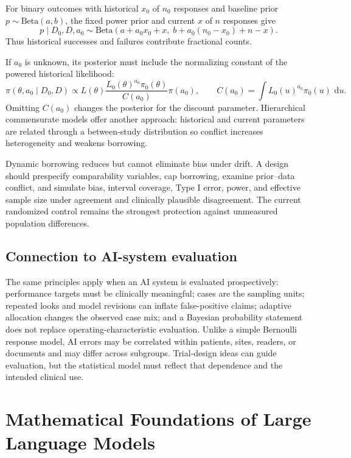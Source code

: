 \documentclass[12pt,oneside]{book}
\numberwithin{equation}{section}
\theoremstyle{definition}
\theoremstyle{plain}
\theoremstyle{remark}
\newcommand{\dd}{\,\mathrm{d}}
\newcommand{\BetaDist}{\mathrm{Beta}}
\begin{document}
For binary outcomes with historical $x_0$ of $n_0$ responses and baseline prior
$p\sim\BetaDist(a,b)$, the fixed power prior and current $x$ of $n$ responses
give
\[
 p\mid D_0,D,a_0
 \sim\BetaDist\!\left(
   a+a_0x_0+x,\;
   b+a_0(n_0-x_0)+n-x
 \right).
\]
Thus historical successes and failures contribute fractional counts.

If $a_0$ is unknown, its posterior must include the normalizing constant of the
powered historical likelihood:
\[
 \pi(\theta,a_0\mid D_0,D)
 \propto
 L(\theta)
 \frac{L_0(\theta)^{a_0}\pi_0(\theta)}{C(a_0)}
 \pi(a_0),
 \qquad
 C(a_0)=\int L_0(u)^{a_0}\pi_0(u)\,\dd u.
\]
Omitting $C(a_0)$ changes the posterior for the discount parameter.  Hierarchical
commensurate models offer another approach: historical and current parameters
are related through a between-study distribution so conflict increases
heterogeneity and weakens borrowing.

Dynamic borrowing reduces but cannot eliminate bias under drift.  A design
should prespecify comparability variables, cap borrowing, examine prior--data
conflict, and simulate bias, interval coverage, Type I error, power, and
effective sample size under agreement and clinically plausible disagreement.
The current randomized control remains the strongest protection against
unmeasured population differences.

\subsection{Connection to AI-system evaluation}

The same principles apply when an AI system is evaluated prospectively:
performance targets must be clinically meaningful; cases are the sampling
units; repeated looks and model revisions can inflate false-positive claims;
adaptive allocation changes the observed case mix; and a Bayesian probability
statement does not replace operating-characteristic evaluation.  Unlike a
simple Bernoulli response model, AI errors may be correlated within patients,
sites, readers, or documents and may differ across subgroups.  Trial-design
ideas can guide evaluation, but the statistical model must reflect that
dependence and the intended clinical use.

\section{Mathematical Foundations of Large Language Models}
\end{document}
